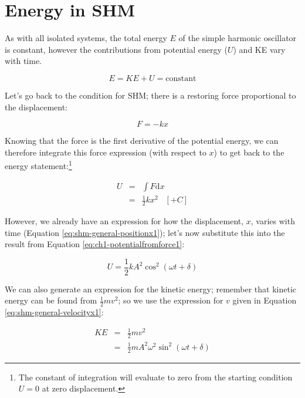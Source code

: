 \documentclass[
]{book}
\begin{document}
\hypertarget{sec:ch1-shm-energy1}{%
\section{Energy in SHM}\label{sec:ch1-shm-energy1}}

As with all isolated systems, the total energy \(E\) of the simple harmonic oscillator is constant, however the contributions from potential energy (\(U\)) and KE vary with time.

\begin{equation}
E = KE + U = \textrm{constant}
\end{equation}

Let's go back to the condition for SHM; there is a restoring force proportional to the displacement:

\begin{equation}
F = -kx
\end{equation}

Knowing that the force is the first derivative of the potential energy, we can therefore integrate this force expression (with respect to \(x\)) to get back to the energy statement:\footnote{The constant of integration will evaluate to zero from the starting condition \(U = 0\) at zero displacement.}

\begin{equation}
\begin{array}{rcl}
U &=& \int F \mathrm{d}x \\
& =& \frac{1}{2}kx^2 \hspace{10pt} [+C]
\end{array}
\label{eq:ch1-potentialfromforce1}
\end{equation}

However, we already have an expression for how the displacement, \(x\), varies with time (Equation \eqref{eq:shm-general-positionx1}); let's now substitute this into the result from Equation \eqref{eq:ch1-potentialfromforce1}:

\begin{equation}
U = \frac{1}{2}kA^2 \cos^2 (\omega t + \delta)
\label{eq:ch1-potentialfromforce2}
\end{equation}

We can also generate an expression for the kinetic energy; remember that kinetic energy can be found from \(\frac{1}{2}mv^2\); so we use the expression for \(v\) given in Equation \eqref{eq:shm-general-velocityx1}:

\begin{equation}
\begin{array}{rcl}
KE &=& \frac{1}{2} mv^2 \\
& =& \frac{1}{2} m A^2 \omega^2 \sin^2 (\omega t + \delta)
\end{array}
\label{eq:ch1-potentialfromforce3}
\end{equation}
\end{document}
